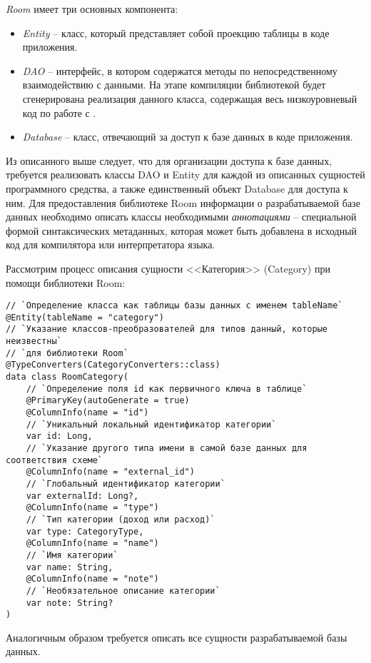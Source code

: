 \emph{Room} имеет три основных компонента:
\begin{itemize}
    \item \emph{Entity} -- класс, который представляет собой проекцию таблицы \sqlite в коде приложения.
    \item \emph{DAO} -- интерфейс, в котором содержатся методы по непосредственному взаимодействию с данными.
    На этапе компиляции библиотекой будет сгенерирована реализация данного класса, содержащая весь низкоуровневый код по работе с \sqlite.
    \item \emph{Database} -- класс, отвечающий за доступ к базе данных в коде приложения.
\end{itemize}

Из описанного выше следует, что для организации доступа к базе данных, требуется реализовать классы DAO и Entity для каждой из описанных сущностей программного средства, а также единственный объект Database для доступа к ним.
Для предоставления библиотеке Room информации о разрабатываемой базе данных необходимо описать классы необходимыми \emph{аннотациями} -- специальной формой синтаксических метаданных, которая может быть добавлена в исходный код для компилятора или интерпретатора языка.

Рассмотрим процесс описания сущности <<Категория>> (Category) при помощи библиотеки Room:

\begin{lstlisting}[style=standard]
// `Определение класса как таблицы базы данных с именем tableName`
@Entity(tableName = "category")
// `Указание классов-преобразователей для типов данный, которые неизвестны`
// `для библиотеки Room`
@TypeConverters(CategoryConverters::class)
data class RoomCategory(
    // `Определение поля id как первичного ключа в таблице`
    @PrimaryKey(autoGenerate = true)
    @ColumnInfo(name = "id")
    // `Уникальный локальный идентификатор категории`
    var id: Long,
    // `Указание другого типа имени в самой базе данных для соответствия схеме`
    @ColumnInfo(name = "external_id")
    // `Глобальный идентификатор категории`
    var externalId: Long?,
    @ColumnInfo(name = "type")
    // `Тип категории (доход или расход)`
    var type: CategoryType,
    @ColumnInfo(name = "name")
    // `Имя категории`
    var name: String,
    @ColumnInfo(name = "note")
    // `Необязательное описание категории`
    var note: String?
)
\end{lstlisting}

Аналогичным образом требуется описать все сущности разрабатываемой базы данных.


